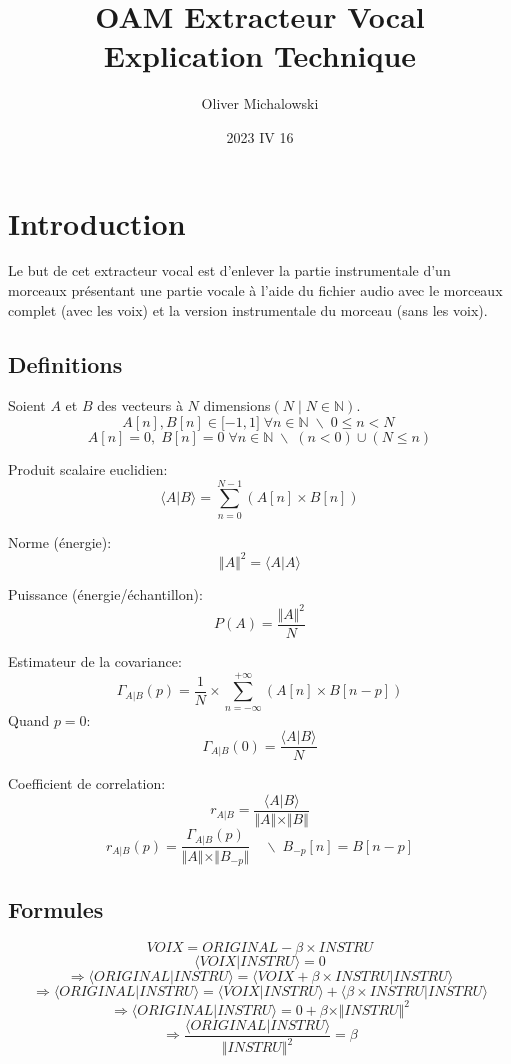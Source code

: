 \documentclass[10pt]{article}
\title{OAM Extracteur Vocal\\Explication Technique}
\author{Oliver Michalowski}
\date{2023 IV 16}
\begin{document}
\maketitle
\tableofcontents

\section{Introduction}
	Le but de cet extracteur vocal est d'enlever la partie instrumentale d'un morceaux présentant
	une partie vocale à l'aide du fichier audio avec le morceaux complet (avec les voix) et la version 
	instrumentale du morceau (sans les voix).
	
	\subsection{Definitions}
		Soient \(A\) et \(B\) des vecteurs à \(N\) dimensions\((N \mid N \in \mathbb{N}) \).
		\[ A[n],B[n]\in \lbrack-1,1\rbrack\;\forall n \in \mathbb{N}\; \backslash \; 0 \leq n < N\ \]
		\[ A[n]=0, \; B[n]=0\;\forall n \in \mathbb{N}\; \backslash \; (n < 0)\cup(N\le n) \]
		
		Produit scalaire euclidien:
		\[\langle A \vert B \rangle = \sum^{N-1}_{n = 0}{(A[n] \times B[n])}\]
		
		Norme (énergie):
		\[\Vert A \Vert^{2} = \langle A \vert A \rangle \]
		
		Puissance (énergie/échantillon):
		\[P(A) = \frac{\Vert A \Vert^{2}}{N}\]
		
		Estimateur de la covariance:
		\[
			\Gamma_{A \vert B}(p) = \frac{1}{N} \times \sum^{+\infty}_{n=-\infty}{(A[n] \times B[n-p])}
		\]
		Quand \(p = 0\):
		\[
			\Gamma_{A \vert B}(0) = \frac{\langle A \vert B \rangle}{N}
		\]
		
		Coefficient de correlation:
		\[
			r_{A \vert B} = \frac{\langle A \vert B \rangle}{\Vert A \Vert \times \Vert B \Vert}
		\]
		\[
			r_{A \vert B}(p) = \frac{\Gamma_{A \vert B}(p)}{\Vert A \Vert \times \Vert B_{-p} \Vert} \quad \backslash \; B_{-p}[n] = B[n - p]
		\]
		

	\subsection{Formules}
		\[VOIX = ORIGINAL - \beta \times INSTRU\]
		\[ \langle VOIX \vert INSTRU \rangle = 0 \]
		\[
			  \Rightarrow  	\langle ORIGINAL						\vert INSTRU \rangle 
			= 				\langle VOIX + \beta \times INSTRU 	\vert INSTRU \rangle
		\]
		\[
			  \Rightarrow  	\langle ORIGINAL				\vert INSTRU \rangle 
			= 				\langle VOIX 				\vert INSTRU \rangle
			+ 				\langle \beta \times INSTRU 	\vert INSTRU \rangle
		\]
		\[
			  \Rightarrow  \langle ORIGINAL \vert INSTRU \rangle 
			= 0
			+ \beta \times \Vert INSTRU \Vert ^{2}
		\]
		\[
			  \Rightarrow  \frac{\langle ORIGINAL \vert INSTRU \rangle}{\Vert INSTRU \Vert ^{2}}
			= \beta
		\]
\end{document}
